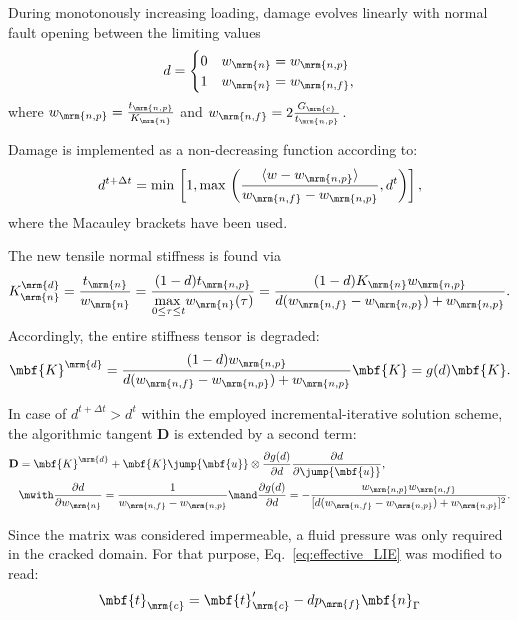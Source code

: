 During monotonously increasing loading, damage evolves linearly with normal fault opening between the limiting values
\begin{equation}
	d =
	\begin{cases}
		0  &  w_\mrm{n} = w_\mrm{n,p}\\
		1   &  w_\mrm{n} = w_\mrm{n,f},
	\end{cases}
	\label{eq:coh_param}
\end{equation}
where $ w_\mrm{n,p} = \frac{t_\mrm{n,p}}{K_\mrm{n}}$ and $ w_\mrm{n,f} = 2 \frac{G_\mrm{c}}{t_\mrm{n,p}}$.

Damage is implemented as a non-decreasing function according to:
\begin{equation}
	d^{t+\Delta t} = \text{min}\, \left[1, \text{max}\, \left( \frac{\langle w - w_\mrm{n,p} \rangle}{w_\mrm{n,f} - w_\mrm{n,p}}, d^t \right) \right],
	\label{eq:d_LIE}
\end{equation}
where the Macauley brackets have been used.

The new tensile normal stiffness is found via
\begin{align}
	K_\mrm{n}^\mrm{d} = \frac{t_\mrm{n}}{w_\mrm{n}} = \frac{(1-d) t_\mrm{n,p}}{\underset{0\leq \tau \leq t}{\text{max\,}}w_\mrm{n}(\tau)} = \frac{(1-d) K_\mrm{n} w_\mrm{n,p}}{d(w_\mrm{n,f} - w_\mrm{n,p})+ w_\mrm{n,p}}.
\end{align}
Accordingly, the entire stiffness tensor is degraded:
\begin{equation}
	\mbf{K}^\mrm{d} = \frac{(1-d) w_\mrm{n,p}}{d(w_\mrm{n,f} - w_\mrm{n,p})+ w_\mrm{n,p}}  \mbf{K} = g(d) \mbf{K}.
\end{equation}

In case of $d^{t+\Delta t} > d^t$ within the employed incremental-iterative solution scheme, the algorithmic tangent $\textbf{D}$ is extended by a second term:
\begin{align}
	\textbf{D} &= \mbf{K}^\mrm{d} + \mbf{K} \jump{\mbf{u}} \otimes \frac{\partial g(d)}{\partial d}\frac{\partial d}{\partial \jump{\mbf{u}}},
	\\
	&\mwith \frac{\partial d}{\partial w_\mrm{n}} = \frac{1}{w_\mrm{n,f} - w_\mrm{n,p}} \mand \frac{\partial g(d)}{\partial d} = -\frac{w_\mrm{n,p} w_\mrm{n,f}}{[d(w_\mrm{n,f} - w_\mrm{n,p})+ w_\mrm{n,p}]^2}.
\end{align}

Since the matrix was considered impermeable, a fluid pressure was only required in the cracked domain. For that purpose, Eq.~\eqref{eq:effective_LIE} was modified to read:
\begin{equation}
 	\mbf{t}_\mrm{c} = \mbf{t}'_\mrm{c} - d p_\mrm{f} \mbf{n}_\Gamma
 	\label{eq:effective_LIE_damage}
\end{equation}

